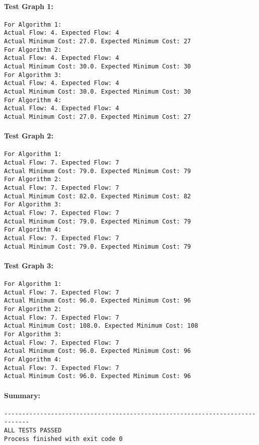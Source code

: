 \documentclass{article}
\begin{document}
\paragraph{Test Graph 1:}
\begin{verbatim}
For Algorithm 1: 
Actual Flow: 4. Expected Flow: 4
Actual Minimum Cost: 27.0. Expected Minimum Cost: 27
For Algorithm 2: 
Actual Flow: 4. Expected Flow: 4
Actual Minimum Cost: 30.0. Expected Minimum Cost: 30
For Algorithm 3: 
Actual Flow: 4. Expected Flow: 4
Actual Minimum Cost: 30.0. Expected Minimum Cost: 30
For Algorithm 4: 
Actual Flow: 4. Expected Flow: 4
Actual Minimum Cost: 27.0. Expected Minimum Cost: 27
\end{verbatim}

\paragraph{Test Graph 2:}
\begin{verbatim}
For Algorithm 1: 
Actual Flow: 7. Expected Flow: 7
Actual Minimum Cost: 79.0. Expected Minimum Cost: 79
For Algorithm 2: 
Actual Flow: 7. Expected Flow: 7
Actual Minimum Cost: 82.0. Expected Minimum Cost: 82
For Algorithm 3: 
Actual Flow: 7. Expected Flow: 7
Actual Minimum Cost: 79.0. Expected Minimum Cost: 79
For Algorithm 4: 
Actual Flow: 7. Expected Flow: 7
Actual Minimum Cost: 79.0. Expected Minimum Cost: 79
\end{verbatim}

\paragraph{Test Graph 3:}
\begin{verbatim}
For Algorithm 1: 
Actual Flow: 7. Expected Flow: 7
Actual Minimum Cost: 96.0. Expected Minimum Cost: 96
For Algorithm 2: 
Actual Flow: 7. Expected Flow: 7
Actual Minimum Cost: 108.0. Expected Minimum Cost: 108
For Algorithm 3: 
Actual Flow: 7. Expected Flow: 7
Actual Minimum Cost: 96.0. Expected Minimum Cost: 96
For Algorithm 4: 
Actual Flow: 7. Expected Flow: 7
Actual Minimum Cost: 96.0. Expected Minimum Cost: 96
\end{verbatim}

\paragraph{Summary:}
\begin{verbatim}
-----------------------------------------------------------------------------
ALL TESTS PASSED
Process finished with exit code 0
\end{verbatim}
\end{document}
